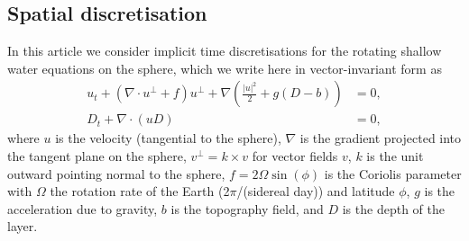 \documentclass[a4paper, 12pt]{article}
\begin{document}
\subsection{Spatial discretisation}
In this article we consider implicit time discretisations for the
rotating shallow water equations on the sphere, which we write
here in vector-invariant form as
\begin{align}
  u_t + \left(\nabla\cdot u^\perp + f\right)u^\perp
  + \nabla\left(\frac{|u|^2}{2} + g(D-b)\right) & = 0, \\
  D_t + \nabla\cdot(uD) & = 0,
\end{align}
where $u$ is the velocity (tangential to the sphere), $\nabla$ is the
gradient projected into the tangent plane on the sphere, $v^\perp =
k\times v$ for vector fields $v$, $k$ is the unit outward pointing
normal to the sphere, $f=2\Omega \sin(\phi)$ is the Coriolis parameter
with $\Omega$ the rotation rate of the Earth (2$\pi$/(sidereal day))
and latitude $\phi$, $g$ is the acceleration due to gravity, $b$ is
the topography field, and $D$ is the depth of the layer.
\end{document}
